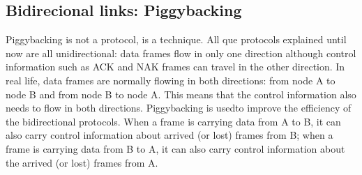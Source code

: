 \documentclass[12pt,a4paper]{report}
\begin{document}
\subsection{Bidirecional links: Piggybacking}
Piggybacking is not a protocol, is a technique. All que protocols explained until now are all unidirectional: data frames flow
in only one direction although control information such as ACK and NAK frames can
travel in the other direction. In real life, data frames are normally flowing in both directions:
from node A to node B and from node B to node A. This means that the control
information also needs to flow in both directions. Piggybacking is usedto improve the efficiency of the bidirectional protocols. When a frame is carrying
data from A to B, it can also carry control information about arrived (or lost) frames
from B; when a frame is carrying data from B to A, it can also carry control information
about the arrived (or lost) frames from A.
\end{document}
